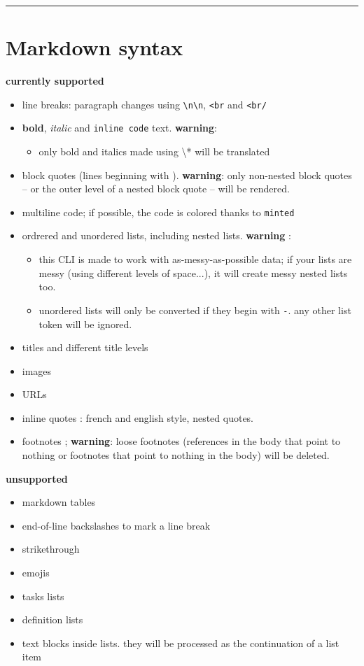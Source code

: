 \documentclass[a4paper, 12pt, twoside]{book}
\begin{document}
\par\noindent\rule{\linewidth}{0.4pt}
\section*{Markdown syntax}

\textbf{currently supported}

\begin{itemize}
\item line breaks: paragraph changes using \texttt{\textbackslash{}n\textbackslash{}n}, \texttt{<br} and \texttt{<br/}
\item \textbf{bold}, \textit{italic} and \texttt{inline code} text. \textbf{warning}:
\begin{itemize} 
 \item only bold and italics made using \textbackslash{}* will be translated
\end{itemize}
\item block quotes (lines beginning with \texttt{}). \textbf{warning}: only non-nested block quotes -- or the outer level of a nested block quote -- will be rendered.
\item multiline code; if possible, the code is colored thanks to \texttt{minted}
\item ordrered and unordered lists, including nested lists. \textbf{warning} : 
\begin{itemize} 
 \item this CLI is made to work with as-messy-as-possible data; if your lists are messy (using different levels of space...), it will create messy nested lists too.
\item unordered lists will only be converted if they begin with \texttt{-}. any other list token will be ignored.
\end{itemize}
\item titles and different title levels
\item images
\item URLs
\item inline quotes : french and english style, nested quotes.
\item footnotes ; \textbf{warning}: loose footnotes (references in the body that point to nothing or footnotes that point to nothing in the body) will be deleted. 
\end{itemize}

\textbf{unsupported}

\begin{itemize}
\item markdown tables
\item end-of-line backslashes to mark a line break
\item strikethrough
\item emojis
\item tasks lists
\item definition lists
\item text blocks inside lists. they will be processed as the continuation of a list item 
\end{itemize}
\end{document}
